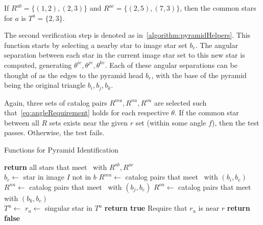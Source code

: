 If $R^{ab} = \{ (1, 2), (2, 3) \}$ and $R^{ac} = \{ (2, 5), (7, 3) \}$, then the common stars for $a$ is
$T^a = \{2, 3\}$.


The second verification step is denoted as  in~\autoref{algorithm:pyramidHelpers}.
This function starts by selecting a nearby star to image star set $b_e$.
The angular separation between each star in the current image star set to this new star is computed, generating
$\theta^{ie}, \theta^{je}, \theta^{ke}$.
Each of these angular separations can be thought of as the edges to the pyramid head $b_e$, with the base of the pyramid
being the original triangle $b_i, b_j, b_k$.

Again, three sets of catalog pairs $R^{mu}, R^{nu}, R^{ou}$ are selected such that~\autoref{eq:angleRequirement} holds
for each respective $\theta$.
If the common star between all $R$ sets exists near the given $r$ set (within some angle $f$), then the test passes.
Otherwise, the test fails.

\begin{algorithm}
    \caption{Functions for Pyramid Identification} \label{algorithm:pyramidHelpers}
    \begin{algorithmic}[1]
        \State \textbf{return} all stars that meet~ with $R^{ab}, R^{ac}$
        \EndFunction
        \\
        \State $b_e \gets $ star in image $I$ not in $b$
        \State $R^{mu} \gets$ catalog pairs that meet~ with $(b_i, b_e)$
        \State $R^{nu} \gets$ catalog pairs that meet~ with $(b_j, b_e)$
        \State $R^{ou} \gets$ catalog pairs that meet~ with $(b_k, b_e)$
        \\
        \State $T^u \gets $ 
        \State $r_u \gets $ singular star in $T^u$
        \State \textbf{return true} \Comment Require that $r_u$ is near $r$
        \EndIf
        \EndIf
        \State \textbf{return false}
        \EndFunction
    \end{algorithmic}
\end{algorithm}

